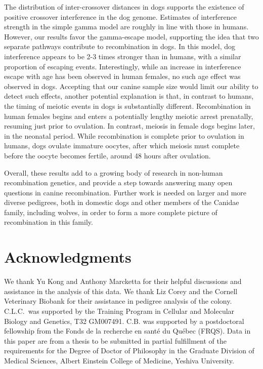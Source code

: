 The distribution of inter-crossover distances in dogs supports the existence of positive crossover interference in the dog genome.
Estimates of interference strength in the simple gamma model are roughly in line with those in humans.
However, our results favor the gamma-escape model, supporting the idea that two separate pathways contribute to recombination in dogs.
In this model, dog interference appears to be 2-3 times stronger than in humans, with a similar proportion of escaping events.
Interestingly, while an increase in interference escape with age has been observed in human females\cite{Campbell2015}, no such age effect was observed in dogs.
Accepting that our canine sample size would limit our ability to detect such effects, another
potential explanation is that, in contrast to humans, 
the timing of meiotic events in dogs is substantially different.
Recombination in human females begins and enters a potentially lengthy meiotic arrest prenatally, resuming just prior to ovulation.
In contrast, meiosis in female dogs begins later, in the neonatal period.
While recombination is complete prior to ovulation in humans, dogs ovulate immature oocytes, after which meiosis must complete before the oocyte becomes fertile, around 48 hours after ovulation\cite{Freixa1987,Chastant-Maillard2011}.

Overall, these results add to a growing body of research in non-human recombination genetics, 
and provide a step towards answering many open questions in canine recombination.
Further work is needed on larger and more diverse pedigrees, both in domestic dogs and other members of the Canidae family, including wolves, in order to form a more complete picture of recombination in this family.

\section{Acknowledgments}
We thank Yu Kong and Anthony Marcketta for their helpful discussions and assistance in the analysis of this data.
We thank Liz Corey and the Cornell Veterinary Biobank for their assistance in pedigree analysis of the colony.
C.L.C.\ was supported by the Training Program in Cellular and Molecular Biology and Genetics, T32 GM007491.
C.B. was supported by a postdoctoral fellowship from the Fonds de la recherche en sant\'{e} du Qu\'{e}bec (FRQS).
Data in this paper are from a thesis to be submitted in partial fulfillment of the requirements for the Degree of Doctor of Philosophy in the Graduate Division of Medical Sciences, Albert Einstein College of Medicine, Yeshiva University.


